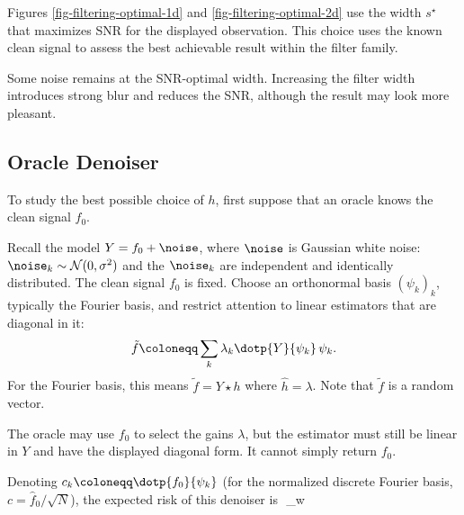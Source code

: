 Figures \ref{fig-filtering-optimal-1d} and \ref{fig-filtering-optimal-2d} use the width $s^\star$ that maximizes SNR for the displayed observation. This choice uses the known clean signal to assess the best achievable result within the filter family.



Some noise remains at the SNR-optimal width. Increasing the filter width introduces strong blur and reduces the SNR, although the result may look more pleasant.


                                                     
\subsection{Oracle Denoiser}

To study the best possible choice of $h$, first suppose that an oracle knows the clean signal $f_0$.
 
Recall the model $Y = f_0 + \noise$, where $\noise$ is Gaussian white noise: $\noise_k \sim \mathcal{N}(0, \sigma^2)$ and the $\noise_k$ are independent and identically distributed. The clean signal $f_0$ is fixed. Choose an orthonormal basis $(\psi_k)_k$, typically the Fourier basis, and restrict attention to linear estimators that are diagonal in it:
\begin{equation}\label{eq:linear-denoiser}
	\tilde{f} \coloneqq \sum_k \lambda_k \dotp{Y}{\psi_k} \, \psi_k.
\end{equation}
For the Fourier basis, this means $\tilde{f} = Y \star h$ where $\hat h=\lambda$. Note that $\tilde{f}$ is a random vector.
 
The oracle may use $f_0$ to select the gains $\lambda$, but the estimator must still be linear in $Y$ and have the displayed diagonal form. It cannot simply return $f_0$.

Denoting $c_k \coloneqq \dotp{f_0}{\psi_k}$ (for the normalized discrete Fourier basis, $c=\hat f_0/\sqrt N$), the expected risk of this denoiser is
$$
	_w